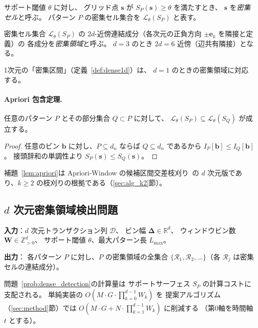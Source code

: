 \begin{definition}[密集セル]\label{def:dense_cell_nd}
サポート閾値 $\theta$ に対し、
グリッド点 $\bm{s}$ が
$S_P(\bm{s}) \geq \theta$ を満たすとき、
$\bm{s}$ を\emph{密集セル}と呼ぶ。
パターン $P$ の密集セル集合を
$\mathcal{L}_\theta(S_P)$ と表す。
\end{definition}

\begin{definition}[密集領域]\label{def:dense_region_nd}
密集セル集合 $\mathcal{L}_\theta(S_P)$ の
$2d$-近傍連結成分（各次元の正負方向 $\pm \bm{e}_k$ を隣接と定義）の
各成分を\emph{密集領域}と呼ぶ。
$d = 3$ のとき $2d = 6$ 近傍（辺共有隣接）となる。
\end{definition}

1次元の「密集区間」（定義~\ref{def:dense1d}）は、
$d = 1$ のときの密集領域に対応する。

\paragraph{Apriori 包含定理.}

\begin{lemma}[密集領域の単調性]\label{lem:apriori}
任意のパターン $P$ とその部分集合 $Q \subset P$ に対して、
$\mathcal{L}_\theta(S_P) \subseteq \mathcal{L}_\theta(S_Q)$ が成立する。
\end{lemma}

\begin{proof}
任意のビン $\bm{b}$ に対し、$P \subseteq d_n$ ならば $Q \subseteq d_n$ であるから
$I_P[\bm{b}] \leq I_Q[\bm{b}]$。
接頭辞和の単調性より $S_P(\bm{s}) \leq S_Q(\bm{s})$。
\end{proof}

補題~\ref{lem:apriori}は Apriori-Window の候補区間交差枝刈り~\cite{aprioriwindow}の
$d$ 次元版であり、$k \geq 2$ の枝刈りの根拠である（\ref{sec:alg_k2}節）。

\subsection{$d$ 次元密集領域検出問題}

\begin{problem}[$d$ 次元密集領域検出]\label{prob:dense_detection}
\textbf{入力}：$d$ 次元トランザクション列 $\mathcal{D}$、
ビン幅 $\bm{\Delta} \in \mathbb{R}^d$、
ウィンドウビン数 $\bm{W} \in \mathbb{Z}_{>0}^d$、
サポート閾値 $\theta$、最大パターン長 $L_{\max}$。

\textbf{出力}：
各パターン $P$ に対し、$P$ の密集領域の全集合
$\{\mathcal{R}_1, \mathcal{R}_2, \ldots\}$（各 $\mathcal{R}_j$ は密集セルの連結成分）。
\end{problem}

問題~\ref{prob:dense_detection}の計算量は
サポートサーフェス $S_P$ の計算コストに支配される。
単純実装の $O\!\left(M \cdot G \cdot \prod_{k=0}^{d-1} W_k\right)$ を
提案アルゴリズム（\ref{sec:method}節）では
$O\!\left(M \cdot G + N \cdot \prod_{k=1}^{d-1} W_k\right)$ に削減する
（第0軸を時間軸 $t$ とする）。
